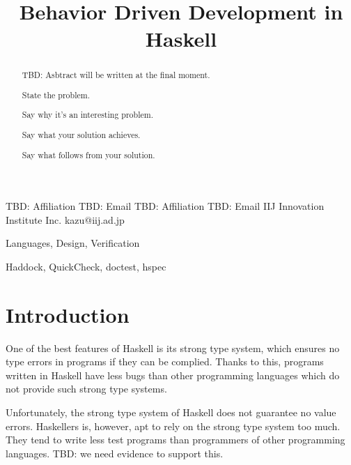 \documentclass[preprint]{sigplanconf}
\begin{document}
\copyrightdata{[to be supplied]}


\title{Behavior Driven Development in Haskell}

           {TBD: Affiliation}
           {TBD: Email}
           {TBD: Affiliation}
           {TBD: Email}
           {IIJ Innovation Institute Inc.}
           {kazu@iij.ad.jp}

\maketitle

\begin{abstract}

TBD: Asbtract will be written at the final moment.

State the problem.

Say why it’s an interesting problem.

Say what your solution achieves.

Say what follows from your solution.

\end{abstract}


\terms Languages, Design, Verification

\keywords Haddock, QuickCheck, doctest, hspec

\section{Introduction}


One of the best features of Haskell is its strong type system, 
which ensures no type errors in programs if they can be complied.
Thanks to this, programs written in Haskell have less bugs
than other programming languages which do not provide such strong type systems.

Unfortunately, the strong type system of Haskell does not guarantee
no value errors.
Haskellers is, however, apt to rely on the strong type system too much.
They tend to write less test programs than programmers of other
programming languages. TBD: we need evidence to support this.
\end{document}
